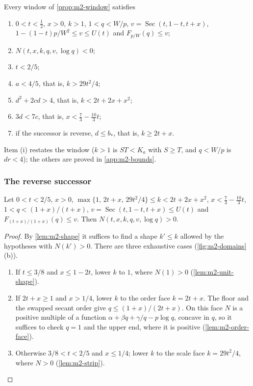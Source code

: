 \begin{lemma}\label{lem:m2-necessary}
Every window of \cref{prop:m2-window} satisfies
\begin{enumerate}[label=(\roman*)]
\item $0<t<\frac12$, $x>0$, $k>1$, $1<q<W/p$, $v=\operatorname{Sec}(t,1-t,t+x)$,
$1-(1-t)p/W^2\le v\le U(t)$ and $F_{p/W}(q)\le v$;
\item $N(t,x,k,q,v,\log q)<0$;
\item $t<2/5$;
\item $a<4/5$, that is, $k>29t^2/4$;
\item $d^2+2cd>4$, that is, $k<2t+2x+x^2$;
\item $3d<7c$, that is, $x<\frac73-\frac{10}3t$;
\item if the successor is reverse, $d\le b_*$, that is, $k\ge2t+x$.
\end{enumerate}
\end{lemma}

Item (i) restates the window ($k>1$ is $ST<K_a$ with $S\ge T$, and $q<W/p$ is $dr<4$); the
others are proved in \cref{app:m2-bounds}.

\subsubsection{The reverse successor}\label{sec:m2-reverse}

\begin{proposition}\label{prop:m2-reverse-core}
Let $0<t<2/5$, $x>0$, $\max\{1,\,2t+x,\,29t^2/4\}\le k<2t+2x+x^2$, $x<\frac73-\frac{10}3t$,
$1<q<(1+x)/(t+x)$, $v=\operatorname{Sec}(t,1-t,t+x)\le U(t)$ and $F_{(t+x)/(1+x)}(q)\le v$.
Then $N(t,x,k,q,v,\log q)>0$.
\end{proposition}

\begin{proof}
By \cref{lem:m2-shape} it suffices to find a shape $k'\le k$ allowed by the hypotheses with
$N(k')>0$. There are three exhaustive cases (\cref{fig:m2-domains}(b)).
\begin{enumerate}[label=(\arabic*)]
\item If $t\le3/8$ and $x\le1-2t$, lower $k$ to $1$, where $N(1)>0$ (\cref{lem:m2-unit-shape}).
\item If $2t+x\ge1$ and $x>1/4$, lower $k$ to the order face $k=2t+x$. The floor and the swapped
secant order give $q\le(1+x)/(2t+x)$. On this face $N$ is a positive
multiple of a function $\alpha+\beta q+\gamma/q-p\log q$, concave in $q$, so it suffices to check
$q=1$ and the upper end, where it is positive (\cref{lem:m2-order-face}).
\item Otherwise $3/8<t<2/5$ and $x\le1/4$; lower $k$ to the scale face $k=29t^2/4$, where
$N>0$ (\cref{lem:m2-strip}).\qedhere
\end{enumerate}
\end{proof}

